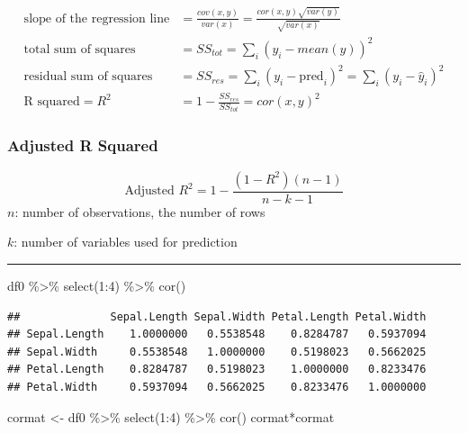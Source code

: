 \documentclass[
]{article}
\newenvironment{Shaded}{\begin{snugshade}}{\end{snugshade}}
\newcommand{\DecValTok}[1]{\textcolor[rgb]{0.00,0.00,0.81}{#1}}
\newcommand{\FunctionTok}[1]{\textcolor[rgb]{0.00,0.00,0.00}{#1}}
\newcommand{\NormalTok}[1]{#1}
\newcommand{\OtherTok}[1]{\textcolor[rgb]{0.56,0.35,0.01}{#1}}
\newcommand{\SpecialCharTok}[1]{\textcolor[rgb]{0.00,0.00,0.00}{#1}}
\begin{document}
\begin{align}
\mbox{slope of the regression line}  &= \frac{cov(x,y)}{var(x)} = \frac{cor(x,y)\sqrt{var(y)}}{\sqrt{var(x)}}\\
\mbox{total sum of squares} &= SS_{tot} = \sum_{i}(y_i-mean(y))^2\\
\mbox{residual sum of squares} &= SS_{res} = \sum_{i}(y_i-\mbox{pred}_i)^2 = \sum_{i}(y_i-\hat{y}_i)^2\\
\mbox{R squared} = R^2 & = 1 - \frac{SS_{res}}{SS_{tot}} = cor(x,y)^2
\end{align}

\hypertarget{adjusted-r-squared}{%
\subsubsection{Adjusted R Squared}\label{adjusted-r-squared}}

\[\text{Adjusted }R^2 = 1- \frac{(1-R^2)(n-1)}{n-k-1}\] \(n\): number of
observations, the number of rows

\(k\): number of variables used for prediction

\begin{center}\rule{0.5\linewidth}{0.5pt}\end{center}

\begin{Shaded}
\begin{Highlighting}[]
\NormalTok{df0 }\SpecialCharTok{\%\textgreater{}\%} \FunctionTok{select}\NormalTok{(}\DecValTok{1}\SpecialCharTok{:}\DecValTok{4}\NormalTok{) }\SpecialCharTok{\%\textgreater{}\%} \FunctionTok{cor}\NormalTok{()}
\end{Highlighting}
\end{Shaded}

\begin{verbatim}
##              Sepal.Length Sepal.Width Petal.Length Petal.Width
## Sepal.Length    1.0000000   0.5538548    0.8284787   0.5937094
## Sepal.Width     0.5538548   1.0000000    0.5198023   0.5662025
## Petal.Length    0.8284787   0.5198023    1.0000000   0.8233476
## Petal.Width     0.5937094   0.5662025    0.8233476   1.0000000
\end{verbatim}

\begin{Shaded}
\begin{Highlighting}[]
\NormalTok{cormat }\OtherTok{\textless{}{-}}\NormalTok{ df0 }\SpecialCharTok{\%\textgreater{}\%} \FunctionTok{select}\NormalTok{(}\DecValTok{1}\SpecialCharTok{:}\DecValTok{4}\NormalTok{) }\SpecialCharTok{\%\textgreater{}\%} \FunctionTok{cor}\NormalTok{()}
\NormalTok{cormat}\SpecialCharTok{*}\NormalTok{cormat}
\end{Highlighting}
\end{Shaded}
\end{document}
